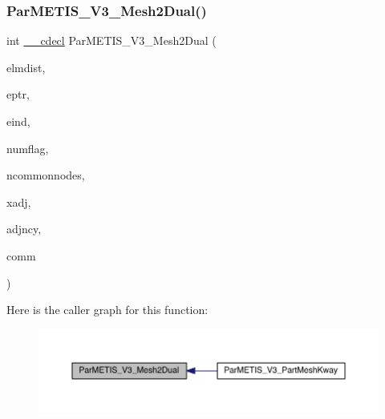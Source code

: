 \subsubsection{\texorpdfstring{Par\+M\+E\+T\+I\+S\+\_\+\+V3\+\_\+\+Mesh2\+Dual()}{ParMETIS\_V3\_Mesh2Dual()}}
{\footnotesize\ttfamily int \hyperlink{include_2parmetis_8h_a238347d7669f8f1e9c83bfe63a2730c4}{\+\_\+\+\_\+cdecl} Par\+M\+E\+T\+I\+S\+\_\+\+V3\+\_\+\+Mesh2\+Dual (\begin{DoxyParamCaption}\item[{\hyperlink{3rd_party_2parmetis-4_80_83_2metis_2include_2metis_8h_aaa5262be3e700770163401acb0150f52}{idx\+\_\+t} $\ast$}]{elmdist,  }\item[{\hyperlink{3rd_party_2parmetis-4_80_83_2metis_2include_2metis_8h_aaa5262be3e700770163401acb0150f52}{idx\+\_\+t} $\ast$}]{eptr,  }\item[{\hyperlink{3rd_party_2parmetis-4_80_83_2metis_2include_2metis_8h_aaa5262be3e700770163401acb0150f52}{idx\+\_\+t} $\ast$}]{eind,  }\item[{\hyperlink{3rd_party_2parmetis-4_80_83_2metis_2include_2metis_8h_aaa5262be3e700770163401acb0150f52}{idx\+\_\+t} $\ast$}]{numflag,  }\item[{\hyperlink{3rd_party_2parmetis-4_80_83_2metis_2include_2metis_8h_aaa5262be3e700770163401acb0150f52}{idx\+\_\+t} $\ast$}]{ncommonnodes,  }\item[{\hyperlink{3rd_party_2parmetis-4_80_83_2metis_2include_2metis_8h_aaa5262be3e700770163401acb0150f52}{idx\+\_\+t} $\ast$$\ast$}]{xadj,  }\item[{\hyperlink{3rd_party_2parmetis-4_80_83_2metis_2include_2metis_8h_aaa5262be3e700770163401acb0150f52}{idx\+\_\+t} $\ast$$\ast$}]{adjncy,  }\item[{M\+P\+I\+\_\+\+Comm $\ast$}]{comm }\end{DoxyParamCaption})}

Here is the caller graph for this function\+:\nopagebreak
\begin{figure}[H]
\begin{center}
\leavevmode
\includegraphics[width=350pt]{3rd_party_2parmetis-4_80_83_2include_2parmetis_8h_a2f9e316d7e0c46037cf231cd82cf9d97_icgraph}
\end{center}
\end{figure}
\mbox{\label{3rd_party_2parmetis-4_80_83_2include_2parmetis_8h_add23df29b4f232ac4c2cca94cc083a32}} 
